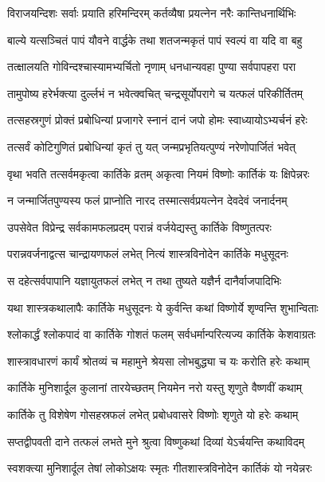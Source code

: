 \twolineshloka
{विराजयन्दिशः सर्वाः प्रयाति हरिमन्दिरम्}
{कर्तव्यैषा प्रयत्नेन नरैः कान्तिधनार्थिभिः}%

\twolineshloka
{बाल्ये यत्सञ्चितं पापं यौवने वार्द्धके तथा}
{शतजन्मकृतं पापं स्वल्पं वा यदि वा बहु}%

\twolineshloka
{तत्क्षालयति गोविन्दश्चास्यामभ्यर्चितो नृणाम्}
{धनधान्यवहा पुण्या सर्वपापहरा परा}%

\twolineshloka
{तामुपोष्य हरेर्भक्त्या दुर्ल्लभं न भवेत्क्वचित्}
{चन्द्रसूर्योपरागे च यत्फलं परिकीर्तितम्}%

\twolineshloka
{तत्सहस्रगुणं प्रोक्तं प्रबोधिन्यां प्रजागरे}
{स्नानं दानं जपो होमः स्वाध्यायोऽभ्यर्चनं हरेः}%

\twolineshloka
{तत्सर्वं कोटिगुणितं प्रबोधिन्यां कृतं तु यत्}
{जन्मप्रभृतियत्पुण्यं नरेणोपार्जितं भवेत्}%

\twolineshloka
{वृथा भवति तत्सर्वमकृत्वा कार्तिके व्रतम्}
{अकृत्वा नियमं विष्णोः कार्तिकं यः क्षिपेन्नरः}%

\twolineshloka
{न जन्मार्जितपुण्यस्य फलं प्राप्नोति नारद}
{तस्मात्सर्वप्रयत्नेन देवदेवं जनार्दनम्}%

\twolineshloka
{उपसेवेत विप्रेन्द्र सर्वकामफलप्रदम्}
{परान्नं वर्जयेद्यस्तु कार्तिके विष्णुतत्परः}%

\twolineshloka
{परान्नवर्जनाद्वत्स चान्द्रायणफलं लभेत्}
{नित्यं शास्त्रविनोदेन कार्तिके मधुसूदनः}%

\twolineshloka
{स दहेत्सर्वपापानि यज्ञायुतफलं लभेत्}
{न तथा तुष्यते यज्ञैर्न दानैर्वाजपादिभिः}%

\twolineshloka
{यथा शास्त्रकथालापैः कार्तिके मधुसूदनः}
{ये कुर्वन्ति कथां विष्णोर्ये शृण्वन्ति शुभान्विताः}%

\twolineshloka
{श्लोकार्द्धं श्लोकपादं वा कार्तिके गोशतं फलम्}
{सर्वधर्मान्परित्यज्य कार्तिके केशवाग्रतः}%

\twolineshloka
{शास्त्रावधारणं कार्यं श्रोतव्यं च महामुने}
{श्रेयसा लोभबुद्ध्या च यः करोति हरेः कथाम्}%

\twolineshloka
{कार्तिके मुनिशार्दूल कुलानां तारयेच्छतम्}
{नियमेन नरो यस्तु शृणुते वैष्णवीं कथाम्}%

\twolineshloka
{कार्तिके तु विशेषेण गोसहस्रफलं लभेत्}
{प्रबोधवासरे विष्णोः शृणुते यो हरेः कथाम्}%

\twolineshloka
{सप्तद्वीपवती दाने तत्फलं लभते मुने}
{श्रुत्वा विष्णुकथां दिव्यां येऽर्चयन्ति कथाविदम्}%

\twolineshloka
{स्वशक्त्या मुनिशार्दूल तेषां लोकोऽक्षयः स्मृतः}
{गीतशास्त्रविनोदेन कार्तिकं यो नयेन्नरः}%

